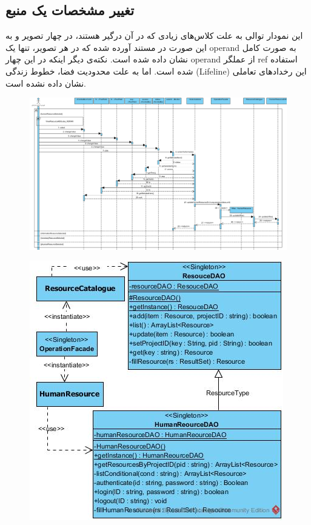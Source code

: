 \begin{landscape}
\section{تغییر مشخصات یک منبع}
این نمودار توالی به علت کلاس‌های زیادی که در آن درگیر هستند، در چهار تصویر و به این صورت در مستند آورده شده که در هر تصویر، تنها یک operand به صورت کامل نشان داده شده است. نکته‌ی دیگر اینکه در این چهار operand از عملگر ref استفاده شده است. اما به علت محدودیت فضا، خطوط زندگی (Lifeline) این رخدادهای تعاملی نشان داده نشده است.
\newpage
\begin{figure}[H]
	\centering
	\includegraphics[scale=0.5]{img/sequence-design/EditResourceAttributes_HUMAN}
\end{figure}
\begin{figure}[H]
	\centering
	\includegraphics[scale=0.6]{img/sequence-design/EditResourceAttributes_HUMANC}

\end{figure}
\end{landscape}
